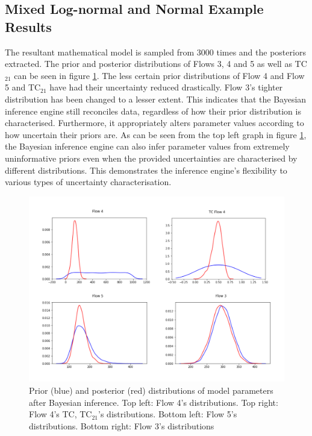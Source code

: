 \documentclass[ %
                    author={Tom Jager},
                supervisor={Dr. Daniel Schien},
                    degree={MEng},
                     title={A Bayesian Inference Engine for Calibrating Uncertainty over UMIS Structured MFA Systems},
                  subtitle={},
                      type={research},
                      year={2019} ]{dissertation}
\begin{document}
\subsection{Mixed Log-normal and Normal Example Results}
\label{sec:mixed_example}
The resultant mathematical model is sampled from $3000$ times and the posteriors extracted. The prior and posterior distributions of Flows 3, 4 and 5 as well as TC$_{21}$  can be seen in figure \ref{fig:lognormal_posteriors}. The less certain prior distributions of Flow 4 and Flow 5 and TC$_{21}$ have had their uncertainty reduced drastically. Flow 3's tighter distribution has been changed to a lesser extent. This indicates that the Bayesian inference engine still reconciles data, regardless of how their prior distribution is characterised. Furthermore, it appropriately alters parameter values according to how uncertain their priors are. As can be seen from the top left graph in figure \ref{fig:lognormal_posteriors}, the Bayesian inference engine can also infer parameter values from extremely uninformative priors even when the provided uncertainties are characterised by different distributions. This demonstrates the inference engine's flexibility to various types of uncertainty characterisation.

\begin{figure}[]
    \centering
    \includegraphics[width=0.66\linewidth]{images/lognormal_posteriors.png}
    \caption{Prior (blue) and posterior (red) distributions of model parameters after Bayesian inference. Top left: Flow 4's distributions. Top right: Flow 4's TC, TC$_{21}$'s distributions. Bottom left: Flow 5's distributions. Bottom right: Flow 3's distributions}
    \label{fig:lognormal_posteriors}
\end{figure}
\end{document}
